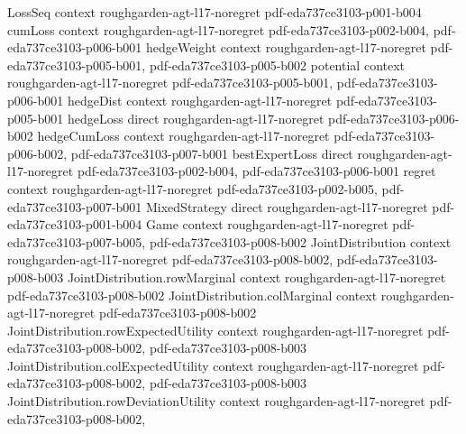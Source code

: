\begin{theorem}
\label{empiricalJoint_isApproxCCE}
\leanok
{}
\proofstep
  {LossSeq}
  {context}
  {roughgarden-agt-l17-noregret}
  {pdf-eda737ce3103-p001-b004}
\proofstep
  {cumLoss}
  {context}
  {roughgarden-agt-l17-noregret}
  {pdf-eda737ce3103-p002-b004,
    pdf-eda737ce3103-p006-b001}
\proofstep
  {hedgeWeight}
  {context}
  {roughgarden-agt-l17-noregret}
  {pdf-eda737ce3103-p005-b001,
    pdf-eda737ce3103-p005-b002}
\proofstep
  {potential}
  {context}
  {roughgarden-agt-l17-noregret}
  {pdf-eda737ce3103-p005-b001,
    pdf-eda737ce3103-p006-b001}
\proofstep
  {hedgeDist}
  {context}
  {roughgarden-agt-l17-noregret}
  {pdf-eda737ce3103-p005-b001}
\proofstep
  {hedgeLoss}
  {direct}
  {roughgarden-agt-l17-noregret}
  {pdf-eda737ce3103-p006-b002}
\proofstep
  {hedgeCumLoss}
  {context}
  {roughgarden-agt-l17-noregret}
  {pdf-eda737ce3103-p006-b002,
    pdf-eda737ce3103-p007-b001}
\proofstep
  {bestExpertLoss}
  {direct}
  {roughgarden-agt-l17-noregret}
  {pdf-eda737ce3103-p002-b004,
    pdf-eda737ce3103-p006-b001}
\proofstep
  {regret}
  {context}
  {roughgarden-agt-l17-noregret}
  {pdf-eda737ce3103-p002-b005,
    pdf-eda737ce3103-p007-b001}
\proofstep
  {MixedStrategy}
  {direct}
  {roughgarden-agt-l17-noregret}
  {pdf-eda737ce3103-p001-b004}
\proofstep
  {Game}
  {context}
  {roughgarden-agt-l17-noregret}
  {pdf-eda737ce3103-p007-b005,
    pdf-eda737ce3103-p008-b002}
\proofstep
  {JointDistribution}
  {context}
  {roughgarden-agt-l17-noregret}
  {pdf-eda737ce3103-p008-b002,
    pdf-eda737ce3103-p008-b003}
\proofstep
  {JointDistribution.rowMarginal}
  {context}
  {roughgarden-agt-l17-noregret}
  {pdf-eda737ce3103-p008-b002}
\proofstep
  {JointDistribution.colMarginal}
  {context}
  {roughgarden-agt-l17-noregret}
  {pdf-eda737ce3103-p008-b002}
\proofstep
  {JointDistribution.rowExpectedUtility}
  {context}
  {roughgarden-agt-l17-noregret}
  {pdf-eda737ce3103-p008-b002,
    pdf-eda737ce3103-p008-b003}
\proofstep
  {JointDistribution.colExpectedUtility}
  {context}
  {roughgarden-agt-l17-noregret}
  {pdf-eda737ce3103-p008-b002,
    pdf-eda737ce3103-p008-b003}
\proofstep
  {JointDistribution.rowDeviationUtility}
  {context}
  {roughgarden-agt-l17-noregret}
  {pdf-eda737ce3103-p008-b002,
}
\end{theorem}
